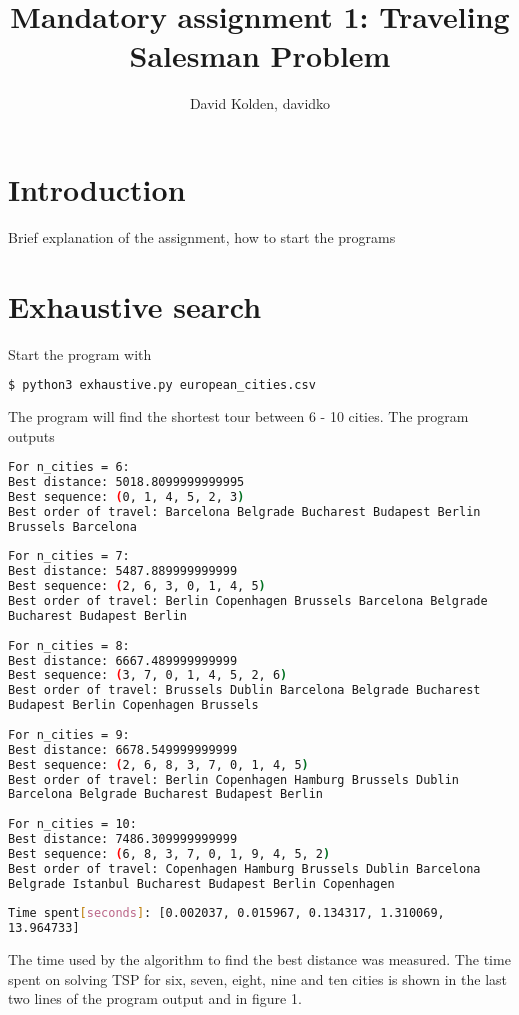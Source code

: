 \documentclass{article}
\author{David Kolden, davidko}
\title{Mandatory assignment 1: Traveling Salesman Problem}
\begin{document}
\maketitle
\tableofcontents

\section{Introduction}
Brief explanation of the assignment, how to start the programs
\section{Exhaustive search}

Start the program with
\begin{lstlisting}[language=bash]
	$ python3 exhaustive.py european_cities.csv 
\end{lstlisting}
The program will find the shortest tour between 6 - 10 cities. The program outputs

\begin{lstlisting}[language=bash]
For n_cities = 6:
Best distance: 5018.8099999999995
Best sequence: (0, 1, 4, 5, 2, 3)
Best order of travel: Barcelona Belgrade Bucharest Budapest Berlin 
Brussels Barcelona
 
For n_cities = 7:
Best distance: 5487.889999999999
Best sequence: (2, 6, 3, 0, 1, 4, 5)
Best order of travel: Berlin Copenhagen Brussels Barcelona Belgrade 
Bucharest Budapest Berlin
 
For n_cities = 8:
Best distance: 6667.489999999999
Best sequence: (3, 7, 0, 1, 4, 5, 2, 6)
Best order of travel: Brussels Dublin Barcelona Belgrade Bucharest 
Budapest Berlin Copenhagen Brussels
 
For n_cities = 9:
Best distance: 6678.549999999999
Best sequence: (2, 6, 8, 3, 7, 0, 1, 4, 5)
Best order of travel: Berlin Copenhagen Hamburg Brussels Dublin 
Barcelona Belgrade Bucharest Budapest Berlin
 
For n_cities = 10:
Best distance: 7486.309999999999
Best sequence: (6, 8, 3, 7, 0, 1, 9, 4, 5, 2)
Best order of travel: Copenhagen Hamburg Brussels Dublin Barcelona 
Belgrade Istanbul Bucharest Budapest Berlin Copenhagen
	 
Time spent[seconds]: [0.002037, 0.015967, 0.134317, 1.310069, 
13.964733]
\end{lstlisting}

The time used by the algorithm to find the best distance was measured. The time spent on solving TSP for six, seven, eight, nine and ten cities is shown in the last two lines of the program output and in figure 1.
\end{document}
